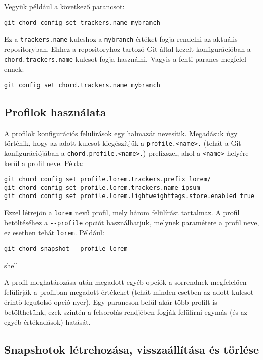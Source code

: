 \documentclass[final]{elteikthesis}[2025/03/25]
\begin{document}
Vegyük például a következő parancsot:

\begin{verbatim}
git chord config set trackers.name mybranch
\end{verbatim}

Ez a \verb|trackers.name| kulcshoz a \verb|mybranch| értéket fogja rendelni az aktuális repositoryban.
Ehhez a repositoryhoz tartozó Git által kezelt konfigurációban a \verb|chord.trackers.name| kulcsot fogja használni.
Vagyis a fenti parancs megfelel ennek:

\begin{verbatim}
git config set chord.trackers.name mybranch
\end{verbatim}

\subsection{Profilok használata} \label{subsec:profiles}

A profilok konfigurációs felülírások egy halmazát nevesítik.
Megadásuk úgy történik, hogy az adott kulcsot kiegészítjük a \verb|profile.<name>.|
(tehát a Git konfigurációjában a \verb|chord.profile.<name>.|) prefixszel,
ahol a \verb|<name>| helyére kerül a profil neve.
Példa:

\begin{verbatim}
git chord config set profile.lorem.trackers.prefix lorem/
git chord config set profile.lorem.trackers.name ipsum
git chord config set profile.lorem.lightweighttags.store.enabled true
\end{verbatim}

Ezzel létrejön a \verb|lorem| nevű profil, mely három felülírást tartalmaz.
A profil betöltéséhez a \verb|--profile| opciót használhatjuk,
melynek paramétere a profil neve, ez esetben tehát \verb|lorem|.
Például:

\begin{verbatim}
git chord snapshot --profile lorem
\end{verbatim}{shell}

A profil meghatározása után megadott egyéb opciók a sorrendnek megfelelően
felülírják a profilban megadott értékeket
(tehát minden esetben az adott kulcsot érintő legutolsó opció nyer).
Egy parancson belül akár több profilt is betölthetünk,
ezek szintén a felsorolás rendjében fogják felülírni egymás (és az egyéb értékadások) hatását.

\subsection{Snapshotok létrehozása, visszaállítása és törlése}
\end{document}
